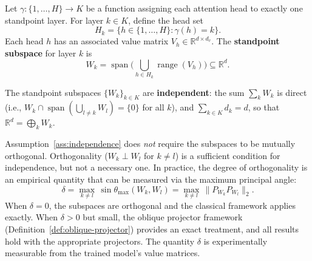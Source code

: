 \begin{definition}
\label{def:head-grouping}
Let $\gamma : \{1, \ldots, H\} \to K$ be a function assigning each attention head to
exactly one standpoint layer. For layer $k \in K$, define the head set
\[
    H_k = \{h \in \{1, \ldots, H\} : \gamma(h) = k\}.
\]
Each head $h$ has an associated value matrix $V_h \in \mathbb{R}^{d \times d_v}$. The
\textbf{standpoint subspace} for layer $k$ is
\[
    W_k = \operatorname{span}\!\Big(\bigcup_{h \in H_k} \operatorname{range}(V_h)\Big)
    \subseteq \mathbb{R}^d.
\]
\end{definition}

\begin{assumption}
\label{ass:independence}
The standpoint subspaces $\{W_k\}_{k \in K}$ are \textbf{independent}: the sum
$\sum_k W_k$ is direct (i.e., $W_k \cap \operatorname{span}(\bigcup_{l \neq k} W_l)
= \{0\}$ for all $k$), and $\sum_{k \in K} d_k = d$, so that
$\mathbb{R}^d = \bigoplus_k W_k$.
\end{assumption}

\begin{remark}
\label{rem:orthogonality}
Assumption~\ref{ass:independence} does \emph{not} require the subspaces to be mutually
orthogonal. Orthogonality ($W_k \perp W_l$ for $k \neq l$) is a sufficient condition for
independence, but not a necessary one. In practice, the degree of orthogonality is an
empirical quantity that can be measured via the maximum principal angle:
\[
    \delta = \max_{k \neq l}\, \sin\theta_{\max}(W_k, W_l)
    = \max_{k \neq l}\, \|P_{W_k} P_{W_l}\|_2.
\]
When $\delta = 0$, the subspaces are orthogonal and the classical framework applies
exactly. When $\delta > 0$ but small, the oblique projector framework
(Definition~\ref{def:oblique-projector}) provides an exact treatment, and all results
hold with the appropriate projectors. The quantity $\delta$ is experimentally measurable
from the trained model's value matrices.
\end{remark}

